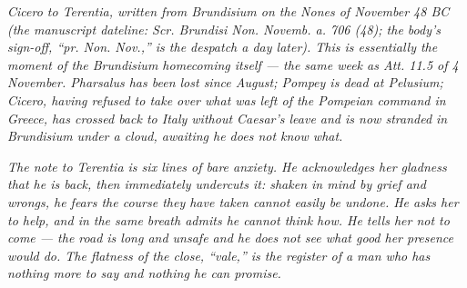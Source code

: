 
\textit{Cicero to Terentia, written from Brundisium on
the Nones of November 48 BC (the manuscript dateline:
\textit{Scr. Brundisi Non. Novemb. a. 706 (48)}; the body's
sign-off, ``pr. Non. Nov.,'' is the despatch a day later).
This is essentially the moment of the Brundisium
homecoming itself --- the same week as \textit{Att.} 11.5
of 4 November. Pharsalus has been lost since August;
Pompey is dead at Pelusium; Cicero, having refused to
take over what was left of the Pompeian command in
Greece, has crossed back to Italy without Caesar's leave
and is now stranded in Brundisium under a cloud, awaiting
he does not know what.}

\textit{The note to Terentia is six lines of bare anxiety.
He acknowledges her gladness that he is back, then
immediately undercuts it: shaken in mind by grief and
wrongs, he fears the course they have taken cannot easily
be undone. He asks her to help, and in the same breath
admits he cannot think how. He tells her not to come ---
the road is long and unsafe and he does not see what good
her presence would do. The flatness of the close,
``vale,'' is the register of a man who has nothing more to
say and nothing he can promise.}
